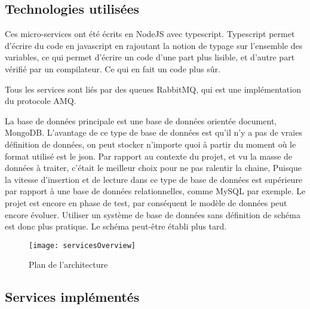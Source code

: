 \documentclass[rapport.tex]{subfiles}
\begin{document}
        \subsection{Technologies utilisées}
        Ces micro-services ont été écrits en NodeJS\cite{node} avec typescript.
            Typescript permet d'écrire du code en javascript en rajoutant la notion de
            typage sur l'ensemble des variables, ce qui permet d'écrire un code
            d'une part
            plus lisible, et d'autre part vérifié par un compilateur. Ce qui en
            fait un code plus sûr.

            Tous les services sont liés par des queues RabbitMQ\cite{rmq}, qui est une implémentation du protocole AMQ. 

            La base de données principale est une base de données orientée
            document, MongoDB. L'avantage de ce type de base de données est
            qu'il n'y a pas de vraies définition de données, on peut stocker
            n'importe quoi à partir du moment où le format utilisé est le
            \gls{json}. Par rapport au contexte du projet, et vu la masse de
            données à traiter, c'était le meilleur choix pour ne pas ralentir
            la chaine, Puisque la vitesse d'insertion et de lecture dans ce
            type de base de données est supérieure par rapport à une base de données
            relationnelles, comme MySQL par exemple.
            Le projet est encore en phase de test, par conséquent le modèle de
            données peut encore évoluer. Utiliser un système de base de données
            sans définition de schéma est donc plus pratique. Le schéma
            peut-être établi plus tard.

        \begin{figure}
            \centering
            \texttt{[image: servicesOverview]}
            \caption{Plan de l'architecture}\label{fig:overview}
        \end{figure}

        \subsection{Services implémentés}
\end{document}
